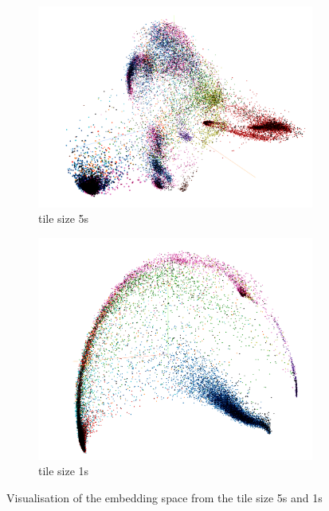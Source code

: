 \begin{figure}[tb]
\centering
\begin{subfigure}{.5\linewidth}
  \centering
  \includegraphics[width=.9\linewidth]{study-doc/experiment_tile_size/assets/embedding_space_5s.png}
  \caption{tile size 5s}
  \label{fig:embedding-5s}
\end{subfigure}%
\begin{subfigure}{.5\linewidth}
  \centering
  \includegraphics[width=.9\linewidth]{study-doc/experiment_tile_size/assets/embedding_space_1s.png}
  \caption{tile size 1s}
  \label{fig:embedding-1s}
\end{subfigure}
\caption{Visualisation of the embedding space from the tile size 5s and 1s}
\label{fig:tile-size-experiment-embedding-space}
\end{figure}

